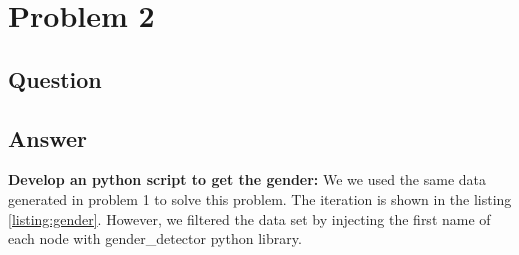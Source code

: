 \section{Problem 2}

\subsection{Question}
\vspace*{10pt}
\justify 


\subsection{Answer}
\textbf{Develop an python script to get the gender:} We we used the same data generated in problem 1 to solve this problem. The iteration is shown in the listing \ref{listing:gender}. However, we filtered the data set by injecting the first name of each node with gender\_detector python library.

